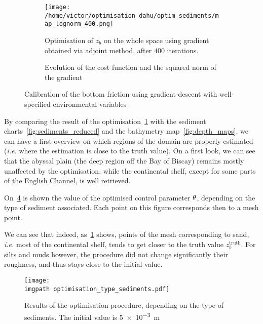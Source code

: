 \documentclass[../../Main_ManuscritThese.tex]{subfiles}
\newcommand{\zob}{z_b}
\newcommand\imgpath{/home/victor/acadwriting/Manuscrit/Text/Chapter5/img/}
\begin{document}
\begin{figure}[ht]
  \begin{subfigure}{\textwidth}
  \centering
  \texttt{[image: /home/victor/optimisation\_dahu/optim\_sediments/map\_lognorm\_400.png]}
  \caption[Optimisation of $\zob$ on the whole
  space]{\label{fig:optimization_map_399} Optimisation of $\zob$ on
    the whole space using gradient obtained via adjoint method, after
    $400$ iterations.}
\end{subfigure}
\begin{subfigure}{\textwidth}
  \centering
  
  \caption{\label{fig:ctrl_true} Evolution of the cost function and
    the squared norm of the gradient}
\end{subfigure}
\caption{Calibration of the bottom friction using gradient-descent
  with well-specified environmental variables}
\end{figure}
By comparing the result of the
optimisation~\cref{fig:optimization_map_399} with the sediment
charts~\cref{fig:sediments_reduced} and the bathymetry
map~\cref{fig:depth_maps}, we can have a first overview on which
regions of the domain are properly estimated (\emph{i.e.} where the
estimation is close to the truth value).  On a first look, we can see
that the abyssal plain (the deep region off the Bay of Biscay) remains
mostly unaffected by the optimisation, while the continental shelf,
except for some parts of the English Channel, is well retrieved.


On~\cref{fig:optimisation_type_sediments} is shown the value of the
optimised control parameter $\theta$, depending on the type of sediment
associated. Each point on this figure corresponds then to a mesh
point.

We can see that indeed, as~\cref{fig:optimization_map_399} shows,
points of the mesh corresponding to sand, \emph{i.e.} most of the
continental shelf, tends to get closer to the truth value
$\zob^{\mathrm{truth}}$. For silts and muds however, the procedure
did not change significantly their roughness, and thus stays close to
the initial value.

\begin{figure}[ht]
  \centering
  \texttt{[image: \\imgpath optimisation\_type\_sediments.pdf]}
  \caption[Final values of the optimisation procedure, based on the
  sediment type]{\label{fig:optimisation_type_sediments} Results of
    the optimisation procedure, depending on the type of
    sediments. The initial value is \SI{5e-3}{\meter}}
\end{figure}
\end{document}
